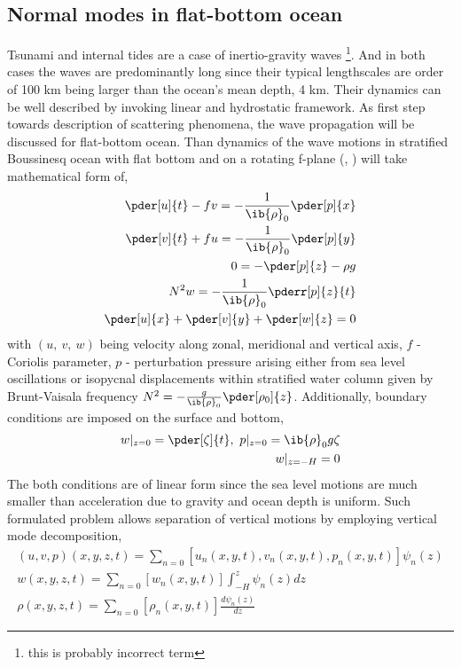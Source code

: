 \subsection{Normal modes in flat-bottom ocean}
Tsunami and internal tides are a case of inertio-gravity waves \footnote{this is probably incorrect term}. And in both cases the waves are predominantly long since their typical lengthscales are order of 100 km being larger than the ocean's mean depth, 4 km. Their dynamics can be well described by invoking linear and hydrostatic framework. As first step towards description of scattering phenomena, the wave propagation will be discussed for flat-bottom ocean. Than dynamics of the wave motions in stratified Boussinesq ocean with flat bottom and on a rotating f-plane (\cite{kundu2008fluid}, \cite{cushman2011introduction}) will take mathematical form of,
\begin{align}
\pder[u]{t} - f v = -\frac{1}{\ib{\rho}_0}\pder[p]{x}\\
\pder[v]{t} + f u = -\frac{1}{\ib{\rho}_0}\pder[p]{y}\\
0 = -\pder[p]{z} - \rho g\\
N^2 w = -\frac{1}{\ib{\rho}_0} \pderr[p]{z}{t}\\
\pder[u]{x} + \pder[v]{y} + \pder[w]{z} = 0
\end{align}
with $(u,~v,~w)$ being velocity along zonal, meridional and vertical axis, $f$ - Coriolis parameter, $p$ - perturbation pressure arising either from sea level oscillations or isopycnal displacements within stratified water column given by Brunt-Vaisala frequency $N^2 = -\frac{g}{\ib{\rho}_0}\pder[\rho_0]{z}$. Additionally, boundary conditions are imposed on the surface and bottom,
\begin{align}
w|_{z = 0} = \pder[\zeta]{t},~p|_{z = 0} = \ib{\rho}_0 g \zeta\\
w|_{z = -H} = 0
\end{align}
The both conditions are of linear form since the sea level motions are much smaller than acceleration due to gravity and ocean depth is uniform. Such formulated problem allows separation of vertical motions by employing vertical mode decomposition,
\begin{align}
(u, v, p)(x,y,z,t) = \sum_{n = 0} [u_n(x,y,t), v_n(x,y,t), p_n(x,y,t)]\psi_n(z)\\
w(x,y,z,t) = \sum_{n = 0} [w_n(x,y,t)] \int_{-H}^z \psi_n(z) dz\\
\rho(x,y,z,t) = \sum_{n = 0} [\rho_n(x,y,t)] \frac{d \psi_n(z)}{dz}
\end{align}
